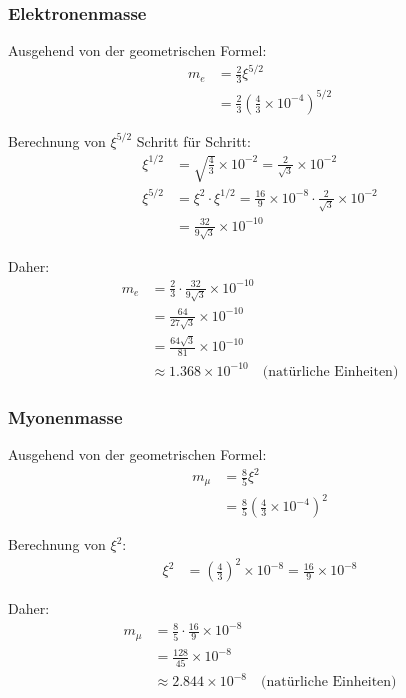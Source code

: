 \documentclass[12pt,a4paper]{article}
\newcommand{\xipar}{\xi}
\begin{document}
	\subsubsection{Elektronenmasse}
	
	\begin{keyresult}
		Ausgehend von der geometrischen Formel:
		\begin{align}
			m_e &= \frac{2}{3} \xipar^{5/2} \\
			&= \frac{2}{3} \left(\frac{4}{3} \times 10^{-4}\right)^{5/2}
		\end{align}
		
		Berechnung von $\xipar^{5/2}$ Schritt für Schritt:
		\begin{align}
			\xipar^{1/2} &= \sqrt{\frac{4}{3}} \times 10^{-2} = \frac{2}{\sqrt{3}} \times 10^{-2} \\
			\xipar^{5/2} &= \xipar^2 \cdot \xipar^{1/2} = \frac{16}{9} \times 10^{-8} \cdot \frac{2}{\sqrt{3}} \times 10^{-2} \\
			&= \frac{32}{9\sqrt{3}} \times 10^{-10}
		\end{align}
		
		Daher:
		\begin{align}
			m_e &= \frac{2}{3} \cdot \frac{32}{9\sqrt{3}} \times 10^{-10} \\
			&= \frac{64}{27\sqrt{3}} \times 10^{-10} \\
			&= \frac{64\sqrt{3}}{81} \times 10^{-10} \\
			&\approx 1.368 \times 10^{-10} \quad \text{(natürliche Einheiten)}
		\end{align}
	\end{keyresult}
	
	\subsubsection{Myonenmasse}
	
	\begin{keyresult}
		Ausgehend von der geometrischen Formel:
		\begin{align}
			m_\mu &= \frac{8}{5} \xipar^{2} \\
			&= \frac{8}{5} \left(\frac{4}{3} \times 10^{-4}\right)^{2}
		\end{align}
		
		Berechnung von $\xipar^{2}$:
		\begin{align}
			\xipar^{2} &= \left(\frac{4}{3}\right)^{2} \times 10^{-8} = \frac{16}{9} \times 10^{-8}
		\end{align}
		
		Daher:
		\begin{align}
			m_\mu &= \frac{8}{5} \cdot \frac{16}{9} \times 10^{-8} \\
			&= \frac{128}{45} \times 10^{-8} \\
			&\approx 2.844 \times 10^{-8} \quad \text{(natürliche Einheiten)}
		\end{align}
	\end{keyresult}
	
\end{document}
